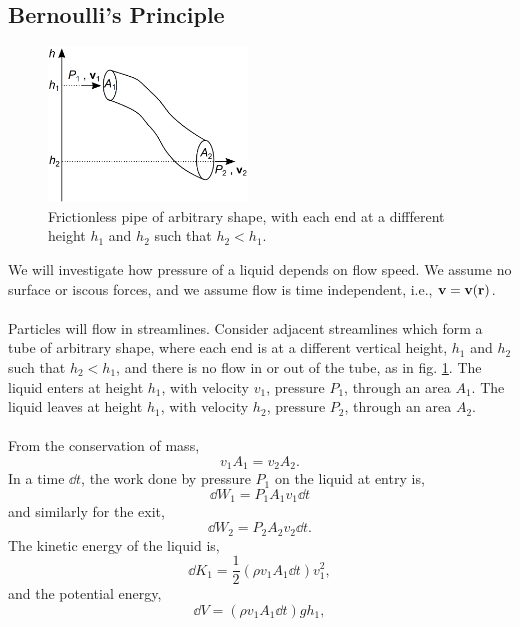 \documentclass{book}
\begin{document}
\subsection{Bernoulli's Principle}
\begin{figure}
	\centering
	\includegraphics[width=200px]{bernouli.png}
	\caption{Frictionless pipe of arbitrary shape, with each end at a diffferent height $h_1$ and $h_2$ such that $h_2 < h_1$.} \label{fig:bernoulli}
\end{figure}
We will investigate how pressure of a liquid depends on flow speed. We assume no surface or iscous forces, and we assume flow is time independent, i.e., $\vb{v} = \vb{v}(\vb{r})$.\\\\
Particles will flow in streamlines. Consider adjacent streamlines which form a tube of arbitrary shape, where each end is at a different vertical height, $h_1$ and $h_2$ such that $h_2 < h_1$, and there is no flow in or out of the tube, as in fig. \ref{fig:bernoulli}. The liquid enters at height $h_1$, with velocity $v_1$, pressure $P_1$, through an area $A_1$. The liquid leaves at height $h_1$, with velocity $h_2$, pressure $P_2$, through an area $A_2$.
\\\\
From the conservation of mass,
\begin{equation}
	v_1A_1 = v_2A_2. \label{eq:consofmass}
\end{equation}
In a time $\dd{t}$, the work done by pressure $P_1$ on the liquid at entry is,
\begin{equation}
	\dd{W}_1 = P_1A_1v_1\dd{t}
\end{equation}
and similarly for the exit,
\begin{equation}
	\dd{W}_2 = P_2A_2v_2\dd{t}.
\end{equation}
The kinetic energy of the liquid is,
\begin{equation}
	\dd{K}_1 = \frac{1}{2}\left(\rho v_1A_1 \dd{t}\right)v_1^2,
\end{equation}
and the potential energy,
\begin{equation}
	\dd{V} = \left(\rho v_1A_1\dd{t}\right)gh_1,
\end{equation}
\end{document}

